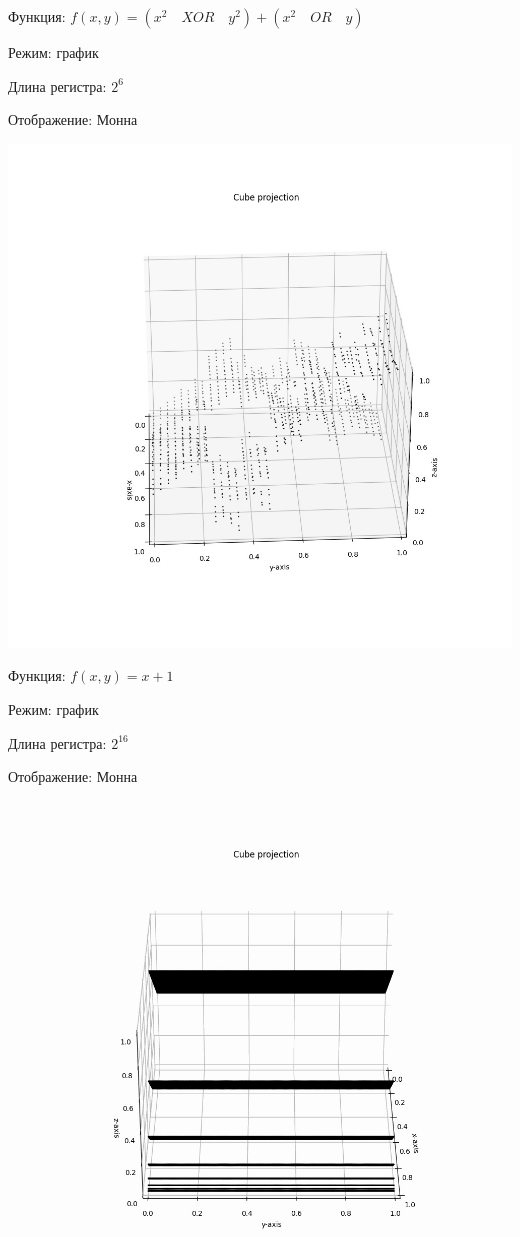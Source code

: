 \newpage

Функция: $f(x, y) = (x^2 \quad XOR \quad y^2)+(x^2 \quad OR \quad y)$

Режим: график

Длина регистра: $2^6$

Отображение: Монна

\includegraphics[scale=0.43]{gr_4.jpg}

\newpage

Функция: $f(x, y) = x+1$

Режим: график

Длина регистра: $2^{16}$

Отображение: Монна

\includegraphics[scale=0.28]{gr_5.jpg}

